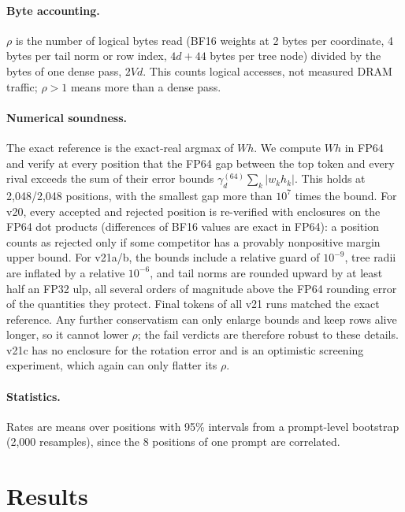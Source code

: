 \documentclass[11pt]{article}
\theoremstyle{definition}
\begin{document}
\paragraph{Byte accounting.} $\rho$ is the number of logical bytes read (BF16
weights at 2 bytes per coordinate, 4 bytes per tail norm or row index, $4d+44$ bytes
per tree node) divided by the bytes of one dense pass, $2Vd$. This counts logical
accesses, not measured DRAM traffic; $\rho>1$ means more than a dense pass.

\paragraph{Numerical soundness.} The exact reference is the exact-real argmax of
$Wh$. We compute $Wh$ in FP64 and verify at every position that the FP64 gap between
the top token and every rival exceeds the sum of their error bounds
$\gamma^{(64)}_d\sum_k|w_kh_k|$. This holds at 2{,}048/2{,}048 positions, with the
smallest gap more than $10^7$ times the bound. For v20, every accepted and rejected
position is re-verified with enclosures on the FP64 dot products (differences of
BF16 values are exact in FP64): a position counts as rejected only if some competitor
has a provably nonpositive margin upper bound. For v21a/b, the bounds include a
relative guard of $10^{-9}$, tree radii are inflated by a relative $10^{-6}$, and
tail norms are rounded upward by at least half an FP32 ulp, all several orders of magnitude above the FP64 rounding error of
the quantities they protect. Final tokens of all v21 runs matched the exact
reference. Any further conservatism can only enlarge bounds and keep rows alive
longer, so it cannot lower $\rho$; the fail verdicts are therefore robust to these
details. v21c has no enclosure for the rotation error and is an optimistic
screening experiment, which again can only flatter its $\rho$.

\paragraph{Statistics.} Rates are means over positions with 95\% intervals from a
prompt-level bootstrap (2{,}000 resamples), since the 8 positions of one prompt
are correlated.

\section{Results}
\label{sec:results}
\end{document}
